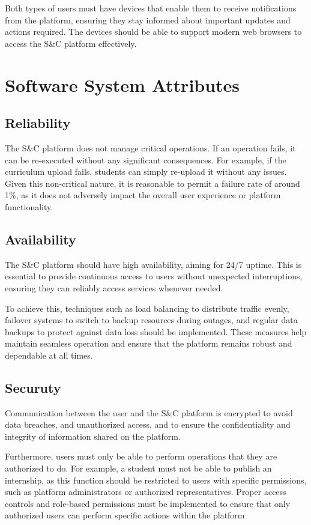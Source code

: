 Both types of users must have devices that enable them to receive notifications from the platform, ensuring they stay informed about important updates and actions required. The devices should be able to support modern web browsers to access the S\&C platform effectively.


\pagebreak
\section{Software System Attributes}
\subsection{Reliability}

The S\&C platform does not manage critical operations. If an operation fails, it can be re-executed without any significant consequences. For example, if the curriculum upload fails, students can simply re-upload it without any issues. Given this non-critical nature, it is reasonable to permit a failure rate of around 1\%, as it does not adversely impact the overall user experience or platform functionality.
 
\subsection{Availability}

The S\&C platform should have high availability, aiming for 24/7 uptime. This is essential to provide continuous access to users without unexpected interruptions, ensuring they can reliably access services whenever needed.

To achieve this, techniques such as load balancing to distribute traffic evenly, failover systems to switch to backup resources during outages, and regular data backups to protect against data loss should be implemented. These measures help maintain seamless operation and ensure that the platform remains robust and dependable at all times.

\subsection{Securuty}

Communication between the user and the S\&C platform is encrypted to avoid data breaches, and unauthorized access, and to ensure the confidentiality and integrity of information shared on the platform.

Furthermore, users must only be able to perform operations that they are authorized to do. For example, a student must not be able to publish an internship, as this function should be restricted to users with specific permissions, such as platform administrators or authorized representatives. Proper access controls and role-based permissions must be implemented to ensure that only authorized users can perform specific actions within the platform
 

